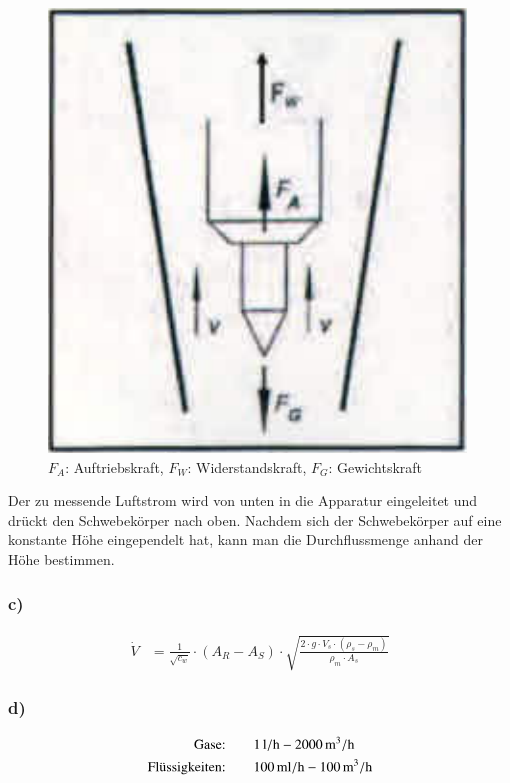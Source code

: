 \begin{figure}[h]
\centering
\includegraphics[scale=0.6]{A2b.png}
\caption{$F_A$: Auftriebskraft, $F_W$: Widerstandskraft, $F_G$: Gewichtskraft}
\end{figure}

Der zu messende Luftstrom wird von unten in die Apparatur eingeleitet und drückt den Schwebekörper nach oben. Nachdem sich der Schwebekörper auf eine konstante Höhe eingependelt hat, kann man die Durchflussmenge anhand der Höhe bestimmen.

\subsubsection*{c)}

\begin{align*}
\dot{V} &= \frac{1}{\sqrt{c_w}} \cdot \left( A_R - A_S \right) \cdot \sqrt{\frac{2 \cdot g \cdot V_s \cdot \left( \rho_s - \rho_m \right)}{\rho_m \cdot A_s}}
\end{align*}


\subsubsection*{d)}


\begin{align*}
\text{Gase:} \qquad &\unit[1]{l/h} - \unit[2000]{m^3/h} \\
\text{Flüssigkeiten:} \qquad &\unit[100]{ml/h} - \unit[100]{m^3/h} \\
\end{align*}

